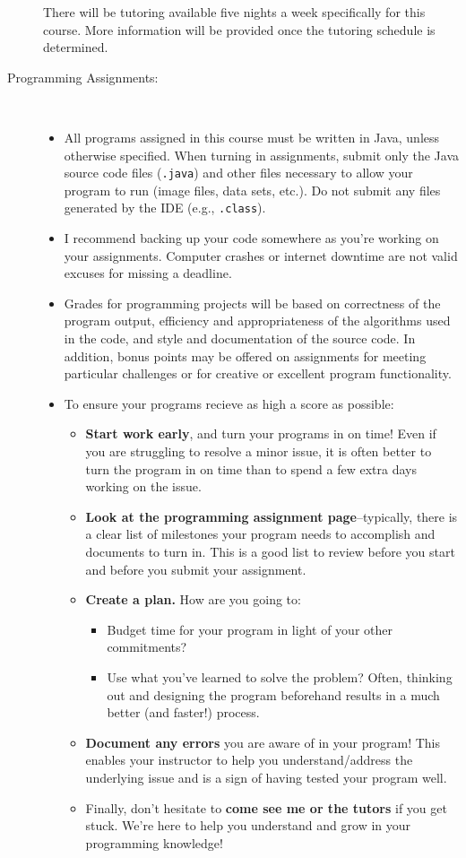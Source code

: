 \documentclass [letterpaper,11pt]{article}
\begin{document}
\begin{description}
There will be tutoring available five nights a week specifically for this course. More information will be provided
once the tutoring schedule is determined.

\item[Programming Assignments:]\

\begin{itemize}\setlength{\itemsep}{0em}\setlength{\parskip}{0pt}
	\item All programs assigned in this course must be written in Java, unless otherwise specified.  When turning in assignments,
	submit only the Java source code files (\texttt{.java}) and other files necessary to allow your program to run (image files, data sets, etc.). Do not submit any files generated by the IDE (e.g., \texttt{.class}).	
			\item I recommend backing up your code somewhere as you're working on your assignments.  Computer
		crashes or internet downtime are not valid excuses for missing a deadline.
				
\item Grades for programming projects will be based on correctness of the program output, efficiency and appropriateness of the algorithms used in the code, and style and documentation of the source code.  In addition, bonus points may be offered on assignments for meeting particular challenges or for creative or excellent program functionality.

\item To ensure your programs recieve as high a score as possible:
	\begin{itemize}
	\item  \textbf{Start work early}, and turn your programs in on time!  Even if you are struggling to resolve a minor issue, it is often better to turn the program in on time than to spend a few extra days working on the issue.
	\item 	\textbf{Look at the programming assignment page}--typically, there is a clear list of milestones your program needs to accomplish and documents to turn in.  This is a good list to review before you start and before you submit your assignment.
	\item  \textbf{Create a plan.} How are you going to:
\begin{itemize}
\item Budget time for your program in light of your other commitments?
\item Use what you've learned to solve the problem?  Often, thinking out and designing the program beforehand results in a much better (and faster!) process.
\end{itemize}
	\item	\textbf{Document any errors} you are aware of in your program!  This enables your instructor to help you understand/address the underlying issue and is a sign of having tested your program well.
\item 	Finally, don't hesitate to \textbf{come see me or the tutors} if you get stuck.  We're here to help you understand and grow in your programming knowledge!
\end{itemize}
\end{itemize}


\end{description}
\end{document}
